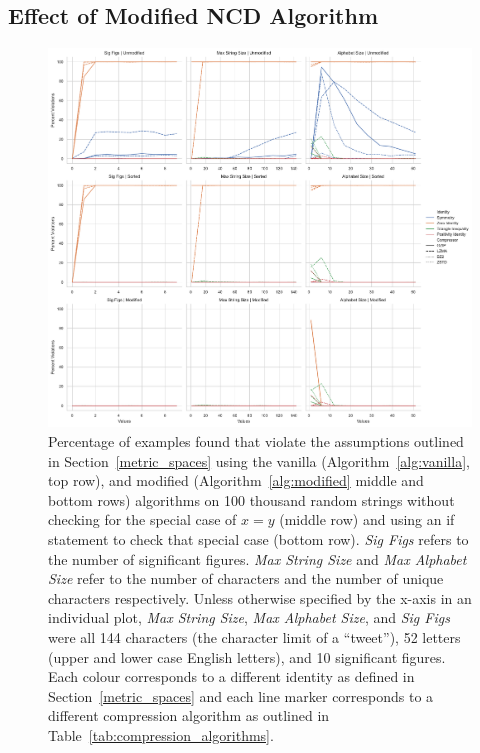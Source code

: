 \documentclass[conference]{IEEEtran}
\begin{document}
\subsection{Effect of Modified NCD Algorithm}

\begin{figure}[htb]
    \centering
    \includegraphics[width=\textwidth]{images/results.pdf}
    \caption{
    Percentage of examples found that violate the assumptions outlined in Section~\ref{metric_spaces} using the vanilla (Algorithm~\ref{alg:vanilla}, top row), and modified (Algorithm~\ref{alg:modified} middle and bottom rows) algorithms on 100 thousand random strings without checking for the special case of $x=y$ (middle row) and using an if statement to check that special case (bottom row). 
    \textit{Sig Figs} refers to the number of significant figures. \textit{Max String Size} and \textit{Max Alphabet Size} refer to the number of characters and the number of unique characters respectively. 
    Unless otherwise specified by the x-axis in an individual plot, \textit{Max String Size}, \textit{Max Alphabet Size}, and \textit{Sig Figs} were all 144 characters (the character limit of a ``tweet''), 52 letters (upper and lower case English letters), and 10 significant figures. Each colour corresponds to a different identity as defined in Section~\ref{metric_spaces} and each line marker corresponds to a different compression algorithm as outlined in Table~\ref{tab:compression_algorithms}.
    }
    \label{fig:mod_assumptions}

\end{figure}
\end{document}
